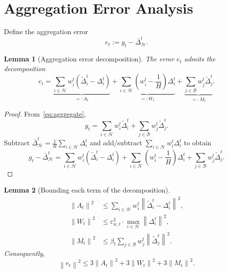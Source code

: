 \documentclass[11pt,a4paper]{article}
\newtheorem{lemma}{Lemma}
\theoremstyle{remark}
\newcommand{\HH}{\mathcal{H}}
\newcommand{\BB}{\mathcal{B}}
\newcommand{\norm}[1]{\left\lVert #1 \right\rVert}
\begin{document}
\section{Aggregation Error Analysis}

Define the aggregation error
\begin{equation}
    e_t := g_t - \bar{\Delta}_{\HH}^t.
    \label{eq:e_t}
\end{equation}

\begin{lemma}[Aggregation error decomposition]
\label{lem:decomp}
The error \(e_t\) admits the decomposition
\begin{equation}
    e_t
    =
    \underbrace{
    \sum_{i \in \HH} w_i^t(\tilde{\Delta}_i^t - \Delta_i^t)
    }_{=:A_t}
    +
    \underbrace{
    \sum_{i \in \HH}
    \left(w_i^t - \frac{1}{H}\right)\Delta_i^t
    }_{=:W_t}
    +
    \underbrace{
    \sum_{j \in \BB} w_j^t \tilde{\Delta}_j^t
    }_{=:M_t}.
    \label{eq:decomposition}
\end{equation}
\end{lemma}

\begin{proof}
From~\eqref{eq:aggregate},
\[
    g_t
    =
    \sum_{i \in \HH} w_i^t \tilde{\Delta}_i^t
    +
    \sum_{j \in \BB} w_j^t \tilde{\Delta}_j^t.
\]
Subtract \(\bar{\Delta}_{\HH}^t = \frac{1}{H}\sum_{i\in\HH}\Delta_i^t\) and
add/subtract \(\sum_{i\in\HH} w_i^t \Delta_i^t\) to obtain
\[
    g_t - \bar{\Delta}_{\HH}^t
    =
    \sum_{i \in \HH} w_i^t(\tilde{\Delta}_i^t-\Delta_i^t)
    +
    \sum_{i \in \HH}
    \left(w_i^t-\frac{1}{H}\right)\Delta_i^t
    +
    \sum_{j \in \BB} w_j^t \tilde{\Delta}_j^t.
\]
\end{proof}

\begin{lemma}[Bounding each term of the decomposition]
\label{lem:term_bounds}
\begin{align}
    \norm{A_t}^2
    &\le
    \sum_{i \in \HH} w_i^t \norm{\tilde{\Delta}_i^t-\Delta_i^t}^2,
    \label{eq:A_t_bound}\\
    \norm{W_t}^2
    &\le
    \varepsilon_{w,t}^2 \cdot \max_{i\in\HH}\norm{\Delta_i^t}^2,
    \label{eq:W_t_bound}\\
    \norm{M_t}^2
    &\le
    \beta_t \sum_{j\in\BB} w_j^t \norm{\tilde{\Delta}_j^t}^2.
    \label{eq:M_t_bound}
\end{align}
Consequently,
\begin{equation}
    \norm{e_t}^2
    \le
    3\norm{A_t}^2 + 3\norm{W_t}^2 + 3\norm{M_t}^2.
    \label{eq:e_abc}
\end{equation}
\end{lemma}
\end{document}
